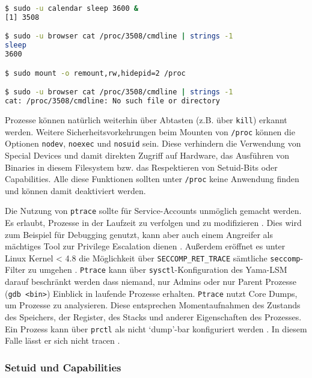 \begin{lstlisting}[language=bash]
$ sudo -u calendar sleep 3600 &
[1] 3508

$ sudo -u browser cat /proc/3508/cmdline | strings -1
sleep
3600

$ sudo mount -o remount,rw,hidepid=2 /proc

$ sudo -u browser cat /proc/3508/cmdline | strings -1
cat: /proc/3508/cmdline: No such file or directory
\end{lstlisting}

Prozesse können natürlich weiterhin über Abtasten (z.B. über \texttt{kill}) erkannt werden. Weitere Sicherheitsvorkehrungen beim Mounten von \texttt{/proc} können die Optionen \texttt{nodev}, \texttt{noexec} und \texttt{nosuid} sein. Diese verhindern die Verwendung von Special Devices und damit direkten Zugriff auf Hardware, das Ausführen von Binaries in diesem Filesystem bzw. das Respektieren von Setuid-Bits oder Capabilities. Alle diese Funktionen sollten unter \texttt{/proc} keine Anwendung finden und können damit deaktiviert werden.

Die Nutzung von \texttt{ptrace} sollte für Service-Accounts unmöglich gemacht werden. Es erlaubt, Prozesse in der Laufzeit zu verfolgen und zu modifizieren \cite{man-ptrace}. Dies wird zum Beispiel für Debugging genutzt, kann aber auch einem Angreifer als mächtiges Tool zur Privilege Escalation dienen \cite{mitre-process-injection}.
Außerdem eröffnet es unter Linux Kernel < 4.8 die Möglichkeit über \texttt{SECCOMP\_RET\_TRACE} sämtliche \texttt{seccomp}-Filter zu umgehen \cite{ptrace-seccomp-bypass}.
\texttt{Ptrace} kann über \texttt{sysctl}-Konfiguration des Yama-LSM darauf beschränkt werden dass niemand, nur Admins oder nur Parent Prozesse (\texttt{gdb <bin>}) Einblick in laufende Prozesse erhalten. \texttt{Ptrace} nutzt Core Dumps, um Prozesse zu analysieren. Diese entsprechen Momentaufnahmen des Zustands des Speichers, der Register, des Stacks und anderer Eigenschaften des Prozesses. Ein Prozess kann über \texttt{prctl} als nicht `dump'-bar konfiguriert werden \cite{man-proc}. In diesem
Falle lässt er sich nicht tracen \cite{man-ptrace}.


\subsubsection{Setuid und Capabilities}

